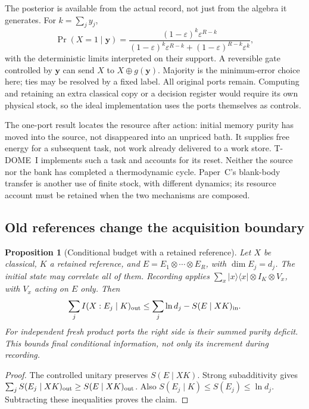 \documentclass[12pt,a4paper]{article}
\newtheorem{proposition}[theorem]{Proposition}
\begin{document}
The posterior is available from the actual record, not just from the
algebra it generates. For \(k=\sum_jy_j\),
\begin{equation}\label{eq:mixed-posterior}
 \Pr(X=1\mid\boldsymbol y)=
 \frac{(1-\varepsilon)^k\varepsilon^{R-k}}
 {(1-\varepsilon)^k\varepsilon^{R-k}
 +(1-\varepsilon)^{R-k}\varepsilon^k},
\end{equation}
with the deterministic limits interpreted on their support. A reversible
gate controlled by \(\boldsymbol y\) can send
\(X\) to \(X\oplus g(\boldsymbol y)\). Majority is the minimum-error
choice here; ties may be resolved by a fixed label. All original ports
remain. Computing and retaining an extra classical copy or a decision
register would require its own physical stock, so the ideal implementation
uses the ports themselves as controls.

The one-port result locates the resource after action: initial memory
purity has moved into the source, not disappeared into an unpriced bath.
It supplies free energy for a subsequent task, not work already delivered
to a work store. T-DOME~I implements such a task and accounts for its
reset. Neither the source nor the bank has completed a thermodynamic cycle.
Paper~C's blank-body transfer is another use of finite stock, with different
dynamics; its resource account must be retained when the two mechanisms
are composed.

\subsection{Old references change the acquisition boundary}

\begin{proposition}[Conditional budget with a retained reference]
\label{prop:conditional-records}
Let \(X\) be classical, \(K\) a retained reference, and
\(E=E_1\otimes\cdots\otimes E_R\), with \(\dim E_j=d_j\).
The initial state may correlate all of them. Recording applies
\(\sum_x|x\rangle\langle x|\otimes I_K\otimes V_x\), with
\(V_x\) acting on \(E\) only. Then
\begin{equation}\label{eq:conditional-records}
 \sum_j I(X:E_j\mid K)_{\rm out}
 \le \sum_j\ln d_j-S(E\mid XK)_{\rm in}.
\end{equation}
For independent fresh product ports the right side is their summed
purity deficit. This bounds final conditional information, not only its
increment during recording.
\end{proposition}
\begin{proof}
The controlled unitary preserves \(S(E\mid XK)\).
Strong subadditivity gives
\(\sum_j S(E_j\mid XK)_{\rm out}\ge S(E\mid XK)_{\rm out}\).
Also \(S(E_j\mid K)\le S(E_j)\le\ln d_j\).
Subtracting these inequalities proves the claim.
\end{proof}
\end{document}

